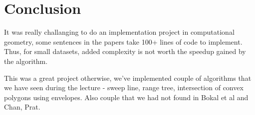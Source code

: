 \documentclass{article}
\begin{document}
\section{Conclusion}
It was really challanging to do an implementation project in computational geometry, some sentences in the papers take 100+ lines of code to implement. Thus, for small datasets, added complexity is not worth the speedup gained by the algorithm.

This was a great project otherwise, we've implemented couple of algorithms that we have seen during the lecture - sweep line, range tree, intersection of convex polygons using envelopes. Also couple that we had not found in Bokal et al and Chan, Prat.



\end{document}

